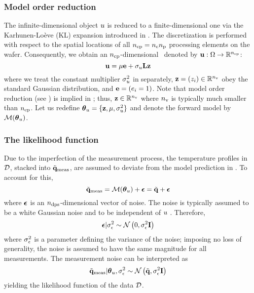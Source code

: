 \subsubsection{Model order reduction} 
The infinite-dimensional object $u$ is reduced to a finite-dimensional one via the Karhunen-Lo\`{e}ve (KL) expansion introduced in . The discretization is performed with respect to the spatial locations of all ${n_\text{cp}} = {n_{\text{c}}} {n_\text{p}}$ processing elements on the wafer. Consequently, we obtain an ${n_\text{cp}}$-dimensional \rv\ denoted by $\mathbf{u}: \Omega \to \mathbb{R}^{n_\text{cp}}$:
\begin{equation} \elabel{kl-approximation}
  \vu = \mu \vI + \sigma_\u \mKL \vz
\end{equation}
where we treat the constant multiplier $\sigma^2_u$ in  separately, $\mathbf{z} = (z_i) \in \mathbb{R}^{n_\text{v}}$ obey the standard Gaussian distribution, and $\mathbf{e} = (e_i = 1)$. Note that model order reduction (see ) is implied in ; thus, $\mathbf{z} \in \mathbb{R}^{n_\text{v}}$ where ${n_\text{v}}$ is typically much smaller than ${n_\text{cp}}$. Let us redefine ${\boldsymbol\theta}_u = \{ \mathbf{z}, \mu, \sigma^2_u \}$ and denote the forward model by $\model{\vparam_\u}$.

\subsubsection{The likelihood function}
Due to the imperfection of the measurement process, the temperature profiles in $\mathcal{D}$, stacked into $\tilde{\mathbf{q}}_{\text{meas}}$, are assumed to deviate from the model prediction in . To account for this,
\[
  \mvT_\meas = \model{\vparam_\u} + \vnoise = \mvT + \vnoise
\]
where $\boldsymbol\epsilon$ is an ${n_\text{dps}}$-dimensional vector of noise. The noise is typically assumed to be a white Gaussian noise and to be independent of $u$ \cite{rasmussen2006, marzouk2009}. Therefore,
\[
  \boldsymbol\epsilon | \sigma^2_\epsilon \sim \mathcal{N}\left( 0, \sigma^2_\epsilon \mathbf{I} \right)
\]
where $\sigma^2_\epsilon$ is a parameter defining the variance of the noise; imposing no loss of generality, the noise is assumed to have the same magnitude for all measurements. The measurement noise can be interpreted as
\begin{equation} \elabel{likelihood}
  \mvT_\meas | \vparam_\u, \sigma_\noise^2 \sim \gaussian{\mvT}{\sigma_\noise^2 \mI}
\end{equation}
yielding the likelihood function of the data $\mathcal{D}$.

